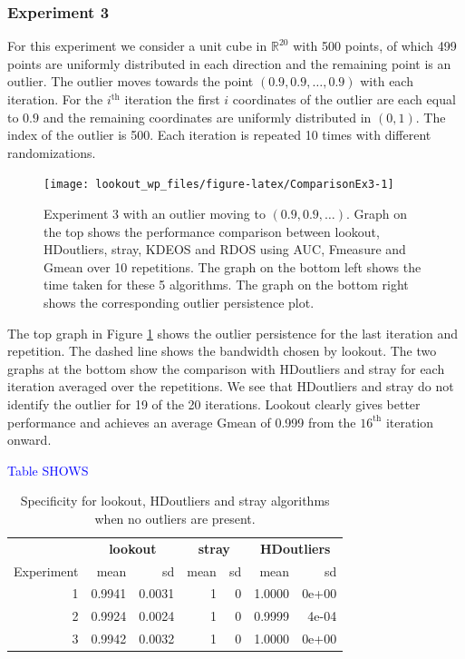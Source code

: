\documentclass[11pt,a4paper,]{article}
\theoremstyle{definition}
\theoremstyle{definition}
\theoremstyle{definition}
\theoremstyle{remark}
\begin{document}
\hypertarget{experiment-3}{%
\subsubsection*{Experiment 3}\label{experiment-3}}

For this experiment we consider a unit cube in \(\mathbb{R}^{20}\) with 500 points, of which 499 points are uniformly distributed in each direction and the remaining point is an outlier. The outlier moves towards the point \(\left( 0.9, 0.9, \dots, 0.9 \right)\) with each iteration. For the \(i^{\text{th}}\) iteration the first \(i\) coordinates of the outlier are each equal to \(0.9\) and the remaining coordinates are uniformly distributed in \((0,1)\). The index of the outlier is 500. Each iteration is repeated 10 times with different randomizations.

\begin{figure}
\texttt{[image: lookout\_wp\_files/figure-latex/ComparisonEx3-1]} \caption{Experiment 3 with an outlier moving to $(0.9, 0.9, \dots)$. Graph on the top shows the performance comparison between lookout, HDoutliers, stray, KDEOS and RDOS using AUC, Fmeasure and Gmean over 10 repetitions. The graph on the bottom left shows the time taken for these 5 algorithms. The graph on the bottom right shows the corresponding outlier persistence plot.}\label{fig:ComparisonEx3}
\end{figure}

The top graph in Figure \ref{fig:ComparisonEx3} shows the outlier persistence for the last iteration and repetition. The dashed line shows the bandwidth chosen by lookout. The two graphs at the bottom show the comparison with HDoutliers and stray for each iteration averaged over the repetitions. We see that HDoutliers and stray do not identify the outlier for 19 of the 20 iterations. Lookout clearly gives better performance and achieves an average Gmean of 0.999 from the \(16^{\text{th}}\) iteration onward.


\textcolor{blue}{Table SHOWS}

\begin{table}

\caption{\label{tab:zerooutliers}Specificity for lookout, HDoutliers and stray algorithms when no outliers are present.}
\centering
\begin{tabular}[t]{rrrrrrr}
\toprule
\multicolumn{1}{c}{\textbf{}} & \multicolumn{2}{c}{\textbf{lookout}} & \multicolumn{2}{c}{\textbf{stray}} & \multicolumn{2}{c}{\textbf{HDoutliers}} \\
\cmidrule(l{3pt}r{3pt}){2-3} \cmidrule(l{3pt}r{3pt}){4-5} \cmidrule(l{3pt}r{3pt}){6-7}
Experiment & mean & sd & mean & sd & mean & sd\\
\midrule
1 & 0.9941 & 0.0031 & 1 & 0 & 1.0000 & 0e+00\\
2 & 0.9924 & 0.0024 & 1 & 0 & 0.9999 & 4e-04\\
3 & 0.9942 & 0.0032 & 1 & 0 & 1.0000 & 0e+00\\
\bottomrule
\end{tabular}
\end{table}
\end{document}
